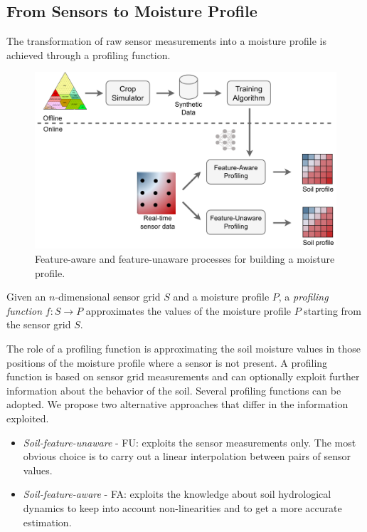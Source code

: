 \subsection{From Sensors to Moisture Profile}
\label{pluto-sec:FromSensorsToMoistureProfile}
The transformation of raw sensor measurements into a moisture profile is achieved through a profiling function. 
\begin{figure}[t]
\centering
\includegraphics[width=1\textwidth]{chapters/physics-aware/pluto/img/process.pdf}
\caption{Feature-aware and feature-unaware processes for building a moisture profile.}
\label{pluto-fig:process}
\end{figure}
\begin{definition}
Given an $n$-dimensional sensor grid $S$ and a moisture profile $P$, a \emph{profiling function} $f : S \rightarrow P$ approximates the values of the moisture profile $P$ starting from the sensor grid $S$.
\end{definition}

The role of a profiling function is approximating the soil moisture values in those positions of the moisture profile where a sensor is not present. 
A profiling function is based on sensor grid measurements and can optionally exploit further information about the behavior of the soil. 
Several profiling functions can be adopted. 
We propose two alternative approaches that differ in the information exploited.
\begin{itemize}
    \item \emph{Soil-feature-unaware} - FU: exploits the sensor measurements only. The most obvious choice is to carry out a linear interpolation between pairs of sensor values.
    \item \emph{Soil-feature-aware} - FA: exploits the knowledge about soil hydrological dynamics to keep into account non-linearities and to get a more accurate estimation.
\end{itemize}

